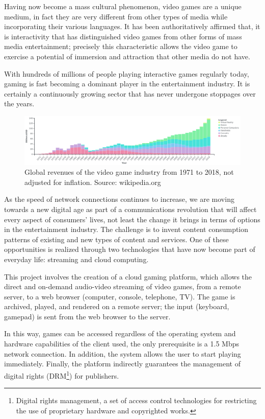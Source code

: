 Having now become a mass cultural phenomenon, video games are a unique medium, in fact they are very different from other types of media while incorporating their various languages. It has been authoritatively affirmed that, it is interactivity that has distinguished video games from other forms of mass media entertainment; precisely this characteristic allows the video game to exercise a potential of immersion and attraction that other media do not have.

With hundreds of millions of people playing interactive games regularly today, gaming is fast becoming a dominant player in the entertainment industry.	It is certainly a continuously growing sector that has never undergone stoppages over the years.

\begin{figure}[H]
	\includegraphics[width=\linewidth]{immagini/valore_commerciale_giochi_globale.png}
	\caption{Global revenues of the video game industry from 1971 to 2018, not adjusted for inflation. Source: wikipedia.org}
	\label{fig:valore_commerciale_giochi_globale}
\end{figure}

As the speed of network connections continues to increase, we are moving towards a new digital age as part of a communications revolution that will affect every aspect of consumers' lives, not least the change it brings in terms of options in the entertainment industry. The challenge is to invent content consumption patterns of existing and new types of content and services. One of these opportunities is realized through two technologies that have now become part of everyday life: streaming and cloud computing.

This project involves the creation of a cloud gaming platform, which allows the direct and on-demand audio-video streaming of video games, from a remote server, to a web browser (computer, console, telephone, TV). The game is archived, played, and rendered on a remote server; the input (keyboard, gamepad) is sent from the web browser to the server.

In this way, games can be accessed regardless of the operating system and hardware capabilities of the client used, the only prerequisite is a 1.5 Mbps network connection. In addition, the system allows the user to start playing immediately. Finally, the platform indirectly guarantees the management of digital rights (DRM\footnote{Digital rights management, a set of access control technologies for restricting the use of proprietary hardware and copyrighted works.}) for publishers.

